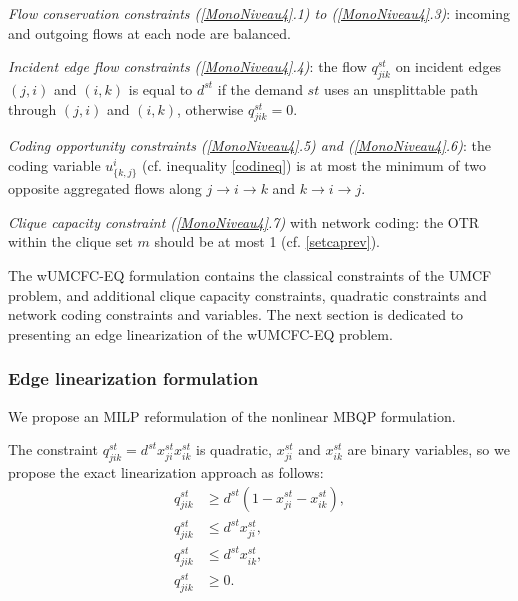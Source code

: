 \textit{Flow conservation constraints (\ref{MonoNiveau4}.1) to (\ref{MonoNiveau4}.3)}: incoming and outgoing flows at each node are balanced. 

\textit{Incident edge flow constraints (\ref{MonoNiveau4}.4)}: the flow $q^{st}_{jik}$ on incident edges $(j,i)$ and $(i,k)$ is equal to $d^{st}$ if the demand $st$ uses an unsplittable path through $(j,i)$ and $(i,k)$, otherwise $q^{st}_{jik} =0$.

\textit{Coding opportunity constraints (\ref{MonoNiveau4}.5) and (\ref{MonoNiveau4}.6)}: the coding variable \(u^i_{\{k,j\}}\) (cf. inequality \eqref{codineq}) is at most the minimum of two opposite aggregated flows along \(j\to i \to k\) and \(k \to i \to j\).

\textit{Clique capacity constraint (\ref{MonoNiveau4}.7)} with network coding: the OTR within the clique set \(m\) should be at most 1 (cf. \eqref{setcaprev}).

The wUMCFC-EQ formulation contains the classical constraints of the UMCF problem, and additional clique capacity constraints, quadratic constraints and network coding constraints and variables. The next section is dedicated to presenting an edge linearization of the wUMCFC-EQ problem.

\subsubsection{Edge linearization formulation}

We propose an MILP reformulation of the nonlinear MBQP formulation.

The constraint \(q^{st}_{jik} = d^{st} x^{st}_{ji}  x^{st}_{ik}\) is quadratic, \( x^{st}_{ji}\) and \( x^{st}_{ik}\) are binary variables, so we propose the exact linearization approach as follows:
\begin{equation}
\label{reflinear}
\begin{split}
    q^{st}_{jik} &\ge d^{st} (1 - x^{st}_{ji} - x^{st}_{ik}),\\
    q^{st}_{jik} &\le d^{st}  x^{st}_{ji}, \\
   q^{st}_{jik} &\le d^{st}  x^{st}_{ik},\\
   q^{st}_{jik} & \ge 0.
\end{split}
\end{equation}

